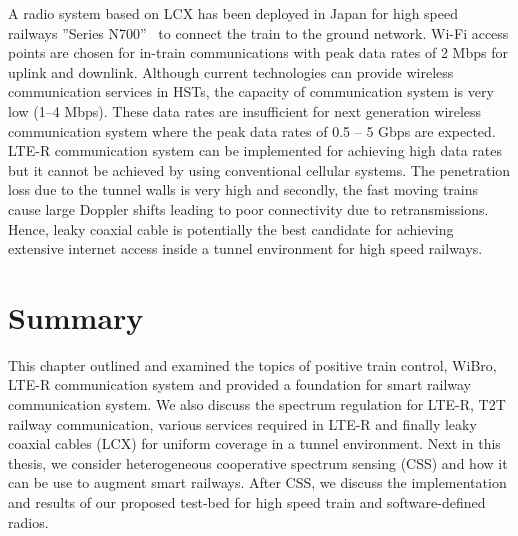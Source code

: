 A radio system based on LCX has been deployed in Japan for high speed railways ''Series N700''~\cite{takatsu2007history} to connect the train to the ground network. Wi-Fi access points are chosen for in-train communications with peak data rates of 2 Mbps for uplink and downlink. Although current technologies can provide wireless communication services in HSTs, the capacity of communication system is very low (1--4 Mbps). These data rates are insufficient for next generation wireless communication system where the peak data rates of 0.5 -- 5 Gbps are expected. LTE-R communication system can be implemented for achieving high data rates but it cannot be achieved by using conventional cellular systems. The penetration loss due to the tunnel walls is very high and secondly, the fast moving trains cause large Doppler shifts leading to poor connectivity due to retransmissions. Hence, leaky coaxial cable is potentially the best candidate for achieving extensive internet access inside a tunnel environment for high speed railways.

\section{Summary}
This chapter outlined and examined the topics of positive train control, WiBro, LTE-R communication system and provided a foundation for smart railway communication system. We also discuss the spectrum regulation for LTE-R, T2T railway communication, various services required in LTE-R and finally leaky coaxial cables (LCX) for uniform coverage in a tunnel environment. Next in this thesis, we consider heterogeneous cooperative spectrum sensing (CSS) and how it can be use to augment smart railways. After CSS, we discuss the implementation and results of our proposed test-bed for high speed train and software-defined radios.\\
